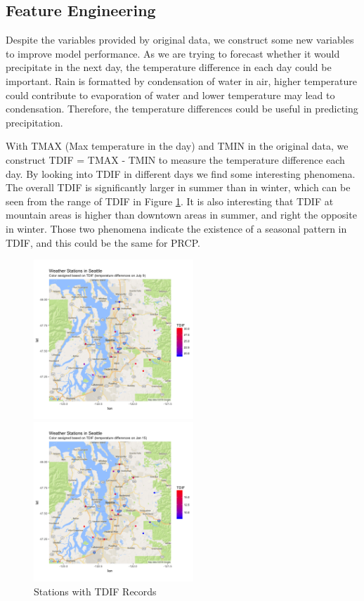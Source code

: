 \subsection{Feature Engineering}

Despite the variables provided by original data, we construct some new variables to improve model performance. As we are trying to forecast whether it would precipitate in the next day, the temperature difference in each day could be important. Rain is formatted by condensation of water in air, higher temperature could contribute to evaporation of water and lower temperature may lead to condensation. Therefore, the temperature differences could be useful in predicting precipitation. 

With TMAX (Max temperature in the day) and TMIN in the original data, we construct TDIF = TMAX - TMIN to measure the temperature difference each day. By looking into TDIF in different days we find some interesting phenomena. The overall TDIF is significantly larger in summer than in winter, which can be seen from the range of TDIF in Figure \ref{tdif}. It is also interesting that TDIF at mountain areas is higher than downtown areas in summer, and right the opposite in winter. Those two phenomena indicate the existence of a seasonal pattern in TDIF, and this could be the same for PRCP.

\begin{figure}[h]
\centering
\begin{minipage}[t]{0.48\textwidth}
\centering
\includegraphics[width=6cm]{tdif1.png}
\end{minipage}
\begin{minipage}[t]{0.48\textwidth}
\centering
\includegraphics[width=6cm]{tdif2.png}
\end{minipage}
\caption{Stations with TDIF Records}
\label{tdif}
\end{figure}